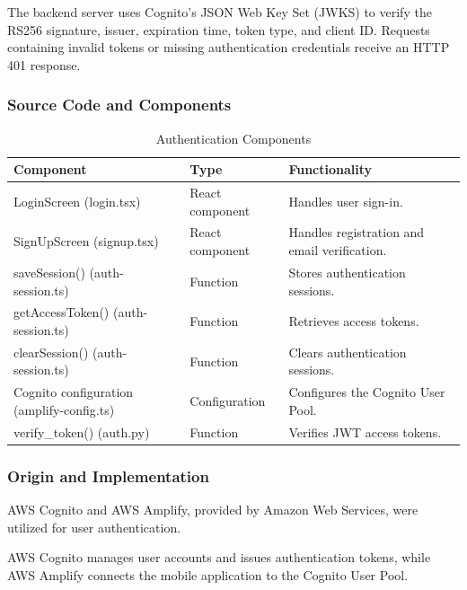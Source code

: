 \documentclass[conference]{IEEEtran}
\newlength{\tablebodywidth}
\begin{document}
The backend server uses Cognito's JSON Web Key Set (JWKS) to verify the RS256 signature, issuer, expiration time, token type, and client ID. Requests containing invalid tokens or missing authentication credentials receive an HTTP 401 response.

\subsubsection{Source Code and Components}

\begin{table}[!t]
\caption{Authentication Components}
\label{tab:t6}
\centering\footnotesize
\setlength{\tabcolsep}{3pt}
\setlength{\tablebodywidth}{\dimexpr\columnwidth-18pt\relax}
\begin{tabular}{>{\raggedright\arraybackslash}p{0.370\tablebodywidth}>{\raggedright\arraybackslash}p{0.200\tablebodywidth}>{\raggedright\arraybackslash}p{0.430\tablebodywidth}}
\toprule
\textbf{Component} & \textbf{Type} & \textbf{Functionality} \\
\midrule
LoginScreen (login.tsx) & React component & Handles user sign-in. \\
SignUpScreen (signup.tsx) & React component & Handles registration and email verification. \\
saveSession() (auth-session.ts) & Function & Stores authentication sessions. \\
getAccessToken() (auth-session.ts) & Function & Retrieves access tokens. \\
clearSession() (auth-session.ts) & Function & Clears authentication sessions. \\
Cognito configuration (amplify-config.ts) & Configuration & Configures the Cognito User Pool. \\
verify\_\allowbreak{}token() (auth.py) & Function & Verifies JWT access tokens. \\
\bottomrule
\end{tabular}
\end{table}

\subsubsection{Origin and Implementation}

AWS Cognito and AWS Amplify, provided by Amazon Web Services, were utilized for user authentication.

AWS Cognito manages user accounts and issues authentication tokens, while AWS Amplify connects the mobile application to the Cognito User Pool.
\end{document}
